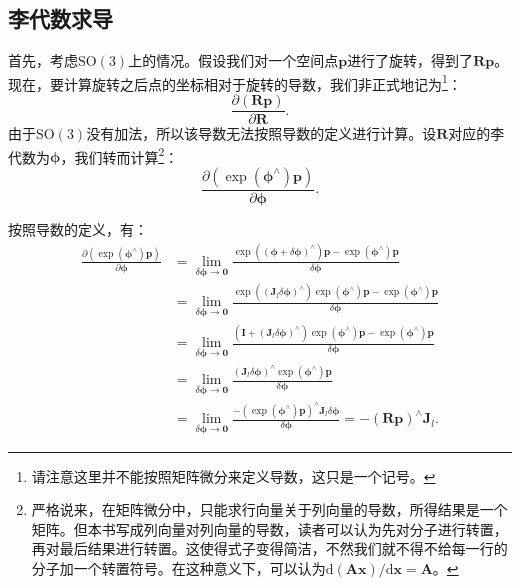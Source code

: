 \subsection{李代数求导}
首先，考虑$\mathrm{SO}(3)$上的情况。假设我们对一个空间点$\bm{p}$进行了旋转，得到了$\bm{R} \bm{p}$。现在，要计算旋转之后点的坐标相对于旋转的导数，我们非正式地记为\footnote{请注意这里并不能按照矩阵微分来定义导数，这只是一个记号。}：
\[
\frac{{\partial \left( {\bm{Rp}} \right)}}{{\partial \bm{R}}}.
\]
由于$\mathrm{SO}(3)$没有加法，所以该导数无法按照导数的定义进行计算。设$\bm{R}$对应的李代数为$\bm{\phi}$，我们转而计算\footnote{严格说来，在矩阵微分中，只能求行向量关于列向量的导数，所得结果是一个矩阵。但本书写成列向量对列向量的导数，读者可以认为先对分子进行转置，再对最后结果进行转置。这使得式子变得简洁，不然我们就不得不给每一行的分子加一个转置符号。在这种意义下，可以认为$\mathrm{d}(\bm{Ax})/\mathrm{d}\bm{x} = \bm{A}$。}：
\[ \frac{{\partial \left( {\exp \left( \bm{\phi} ^ \wedge \right) \bm{p}} \right)}}{{\partial \bm{\phi} }}. \]

按照导数的定义，有：
\begin{align*}
\frac{{\partial \left( {\exp \left( {{ \bm{\phi} ^ \wedge }} \right) \bm{p}} \right)}}{{\partial \bm{\phi} }} &= \mathop {\lim }\limits_{\delta \bm{\phi}  \to \bm{0}} \frac{{\exp \left( {{{\left( {\bm{\phi}  + \delta \bm{\phi} } \right)}^ \wedge }} \right) \bm{p} - \exp \left( {{\bm{\phi} ^ \wedge }} \right)\bm{p}}}{{\delta \bm{\phi} }}\\
& = \mathop {\lim }\limits_{\delta \bm{\phi}  \to \bm{0}} \frac{{\exp \left( {{{\left( {{\bm{J}_l}\delta \bm{\phi} } \right)}^ \wedge }} \right)\exp \left( {{\bm{\phi} ^ \wedge }} \right) \bm{p} - \exp \left( {{\bm{\phi} ^ \wedge }} \right) \bm{p}}}{{\delta \bm{\phi} }}\\
&= \mathop {\lim }\limits_{\delta \bm{\phi}  \to \bm{0}} \frac{{\left( { \bm{I} + {{\left( {{ \bm{J}_l}\delta \bm{\phi} } \right)}^ \wedge }} \right)\exp \left( {{\bm{\phi} ^ \wedge }} \right) \bm{p} - \exp \left( {{\bm{\phi} ^ \wedge }} \right)\bm{p}}}{{\delta \bm{\phi} }}\\
&= \mathop {\lim }\limits_{\delta \bm{\phi}  \to \bm{0}} \frac{{{{\left( {{\bm{J}_l}\delta \bm{\phi} } \right)}^ \wedge }\exp \left( {{\bm{\phi} ^ \wedge }} \right)\bm{p}}}{{\delta \bm{\phi} }}\\
&= \mathop {\lim }\limits_{\delta \bm{\phi}  \to \bm{0}} \frac{{ - {{\left( {\exp \left( {{\bm{\phi} ^ \wedge }} \right)\bm{p}} \right)}^ \wedge }{\bm{J}_l}\delta \bm{\phi} }}{{\delta \bm{\phi}}} =  - {\left( {\bm{Rp}} \right)^ \wedge }{\bm{J}_l}.
\end{align*}


